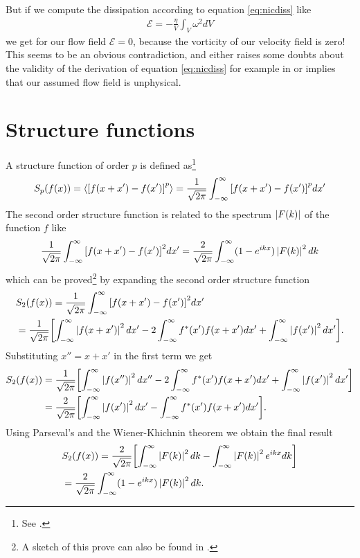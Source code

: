 But if we compute the dissipation according to equation \eqref{eq:nicdiss}
like
\begin{align}
\mathcal{E} = -\frac{\eta}{V} \int_V  \omega^2 dV
\end{align}
we get for our flow field $\mathcal{E} = 0$, because the vorticity of
our velocity field is zero! This seems to be an obvious contradiction,
and either raises some doubts about the validity of the derivation of equation
\eqref{eq:nicdiss} for example in \citet{Frisch1995} or implies that our 
assumed flow field is unphysical.


\section{Structure functions}
A structure function of order $p$ is defined as\footnote{See
\citet{Pope2000}.}
\begin{align}
S_p(f(x))=\langle { \left[ f(x+x')-f(x') \right] }^p \rangle = \frac{1}{\sqrt{2\pi}} \int_{-\infty}^{\infty} { \left[ f(x+x')-f(x') \right] }^p
dx'
\end{align}
The second order structure function is related to the spectrum
$\left\lvert F(k)\right\rvert$ of the function $f$ like
\begin{align}
\frac{1}{\sqrt{2\pi}} \int_{-\infty}^{\infty} { \left[ f(x+x')-f(x') \right] }^2 dx' = \frac{2}{\sqrt{2\pi}}\int_{-\infty}^{\infty} (1-e^{ikx})
\left\lvert F(k)\right\rvert^2 dk \label{eq:structspec}
\end{align}
which can be proved\footnote{A sketch of this prove can also be found in
\citet[Appendix G]{Pope2000}.} by expanding the second order structure function 
\begin{align*}
&S_2(f(x))=\frac{1}{\sqrt{2\pi}} \int_{-\infty}^{\infty} { \left[ f(x+x')-f(x') \right] }^2 dx'\\
&= \frac{1}{\sqrt{2\pi}} { \left[ \int_{-\infty}^{\infty} \left\lvert f(x+x')\right\rvert^2 dx' 
- 2 \int_{-\infty}^{\infty} f^*(x')f(x+x')dx'
+ \int_{-\infty}^{\infty} \left\lvert f(x')\right\rvert^2 dx' \right] }.
\end{align*}
Substituting $x''=x+x'$ in the first term we get
\begin{align*}
S_2(f(x)) &= \frac{1}{\sqrt{2\pi}} { \left[ \int_{-\infty}^{\infty} \left\lvert f(x'')\right\rvert^2 dx'' 
- 2\int_{-\infty}^{\infty} f^*(x')f(x+x')dx'
+\int_{-\infty}^{\infty} \left\lvert f(x')\right\rvert^2 dx' \right] }\\
&= \frac{2}{\sqrt{2\pi}} { \left[ \int_{-\infty}^{\infty} \left\lvert f(x')\right\rvert^2 dx'-\int_{-\infty}^{\infty} f^*(x')f(x+x')dx' \right] }.
\end{align*}
Using Parseval's and the Wiener-Khichnin theorem we obtain the final result
\begin{align*}
&S_2(f(x))=\frac{2}{\sqrt{2\pi}} { \left[ \int_{-\infty}^{\infty} \left\lvert F(k)\right\rvert^2 dk
-\int_{-\infty}^{\infty} \left\lvert F(k)\right\rvert^2 e^{ikx} dk \right] } \\
&= \frac{2}{\sqrt{2\pi}}\int_{-\infty}^{\infty} (1-e^{ikx})\left\lvert F(k)\right\rvert^2 dk. 
\end{align*}

